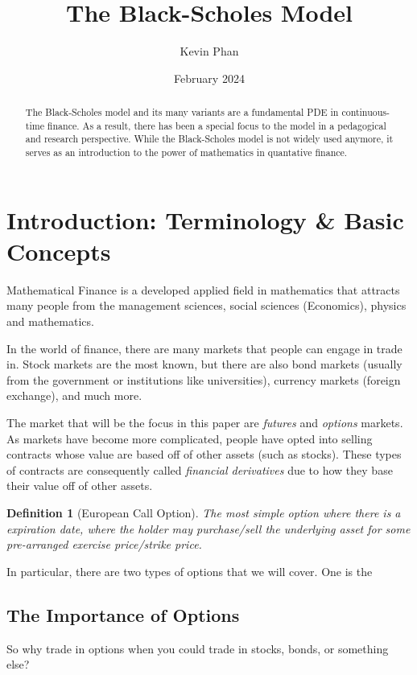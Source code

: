 \documentclass{article}
\title{The Black-Scholes Model}
\author{Kevin Phan}
\date{February 2024}
\newtheorem{definition}{Definition}[section]
\begin{document}
\maketitle

\begin{abstract}
    The Black-Scholes model and its many variants are a fundamental PDE in 
    continuous-time finance. As a result, there has been a special focus to the 
    model in a pedagogical and research perspective. While the Black-Scholes model is not widely used anymore, 
    it serves as an introduction to the power of mathematics in quantative finance. 
\end{abstract}

\section{Introduction: Terminology \& Basic Concepts}

Mathematical Finance is a developed applied field in mathematics that attracts many people from the management sciences, social sciences (Economics), physics and mathematics.

In the world of finance, there are many markets that people can engage in trade in. Stock markets are the most known, 
but there are also bond markets (usually from the government or institutions like universities), currency markets (foreign exchange), and much more. 

The market that will be the focus in this paper are \emph{futures} and \emph{options} markets. As markets have become more complicated, people have 
opted into selling contracts whose value are based off of other assets (such as stocks). These types of contracts are consequently called \emph{financial derivatives}
due to how they base their value off of other assets. 


 
\begin{definition}[European Call Option]
The most simple option where there is a expiration date, 
where the holder may purchase/sell the underlying asset for some pre-arranged exercise price/strike price.
\end{definition}
In particular, there are two types of options that we will cover. One is the 
\subsection*{The Importance of Options}

So why trade in options when you could trade in stocks, bonds, or something else? 
\end{document}
